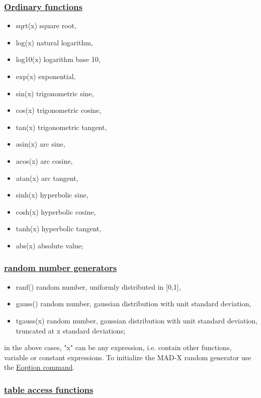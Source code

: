 \subsubsection{\href{function}{Ordinary functions}}
\begin{itemize}
	\item sqrt(x) square root, 
	\item log(x) natural logarithm, 
	\item log10(x) logarithm base 10, 
	\item exp(x) exponential, 
	\item sin(x) trigonometric sine, 
	\item cos(x) trigonometric cosine, 
	\item tan(x) trigonometric tangent, 
	\item asin(x) arc sine, 
	\item acos(x) arc cosine, 
	\item atan(x) arc tangent, 
	\item sinh(x) hyperbolic sine, 
	\item cosh(x) hyperbolic cosine, 
	\item tanh(x) hyperbolic tangent, 
	\item abs(x) absolute value; 
\end{itemize}

\subsubsection{\href{random}{random number generators}}
\begin{itemize}
	\item ranf() random number, uniformly distributed in [0,1], 
	\item gauss() random number, gaussian distribution with unit standard deviation, 
	\item tgauss(x) random number, gaussian distribution with unit standard deviation, truncated at x standard deviations; 
\end{itemize} 


in the above cases, "x" can be any expression, i.e. contain other
functions, variable or constant expressions. To initialize the MAD-X
random generator use the
\href{../error/error_option.html#EOPTION}{Eoption command}.  

\subsubsection{\href{table}{table access functions}}

